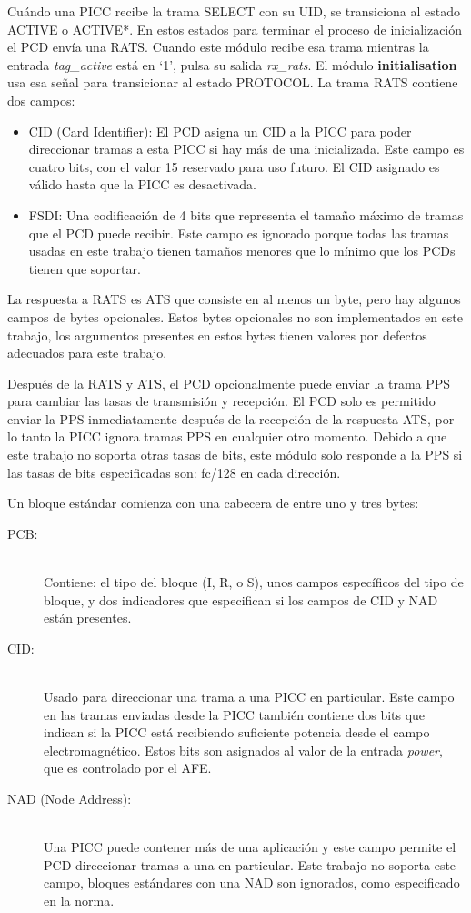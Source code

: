 \documentclass[a4paper, twoside, 11pt]{report}
\begin{document}
Cuándo una PICC recibe la trama SELECT con su UID, se transiciona al estado ACTIVE o ACTIVE*. En estos estados para terminar el proceso de inicialización el PCD envía una RATS. Cuando este módulo recibe esa trama mientras la entrada \textit{tag\_active} está en ‘1’, pulsa su salida \textit{rx\_rats}. El módulo \textbf{initialisation} usa esa señal para transicionar al estado PROTOCOL. La trama RATS contiene dos campos:

\begin{itemize}
  \item CID (Card Identifier): El PCD asigna un CID a la PICC para poder direccionar tramas a esta PICC si hay más de una inicializada. Este campo es cuatro bits, con el valor 15 reservado para uso futuro. El CID asignado es válido hasta que la PICC es desactivada.
  \item FSDI: Una codificación de 4 bits que representa el tamaño máximo de tramas que el PCD puede recibir. Este campo es ignorado porque todas las tramas usadas en este trabajo tienen tamaños menores que lo mínimo que los PCDs tienen que soportar.
\end{itemize}

La respuesta a RATS es ATS que consiste en al menos un byte, pero hay algunos campos de bytes opcionales. Estos bytes opcionales no son implementados en este trabajo, los argumentos presentes en estos bytes tienen valores por defectos adecuados para este trabajo.

Después de la RATS y ATS, el PCD opcionalmente puede enviar la trama PPS para cambiar las tasas de transmisión y recepción. El PCD solo es permitido enviar la PPS inmediatamente después de la recepción de la respuesta ATS, por lo tanto la PICC ignora tramas PPS en cualquier otro momento. Debido a que este trabajo no soporta otras tasas de bits, este módulo solo responde a la PPS si las tasas de bits especificadas son: fc/128 en cada dirección.

Un bloque estándar comienza con una cabecera de entre uno y tres bytes: 

\begin{description}
  \item[PCB:] \hfill \\ Contiene: el tipo del bloque (I, R, o S), unos campos específicos del tipo de bloque, y dos indicadores que especifican si los campos de CID y NAD están presentes.
  \item[CID:] \hfill \\ Usado para direccionar una trama a una PICC en particular. Este campo en las tramas enviadas desde la PICC también contiene dos bits que indican si la PICC está recibiendo suficiente potencia desde el campo electromagnético. Estos bits son asignados al valor de la entrada \textit{power}, que es controlado por el AFE.
  \item[NAD (Node Address):] \hfill \\ Una PICC puede contener más de una aplicación y este campo permite el PCD direccionar tramas a una en particular. Este trabajo no soporta este campo, bloques estándares con una NAD son ignorados, como especificado en la norma.
\end{description}
\end{document}
